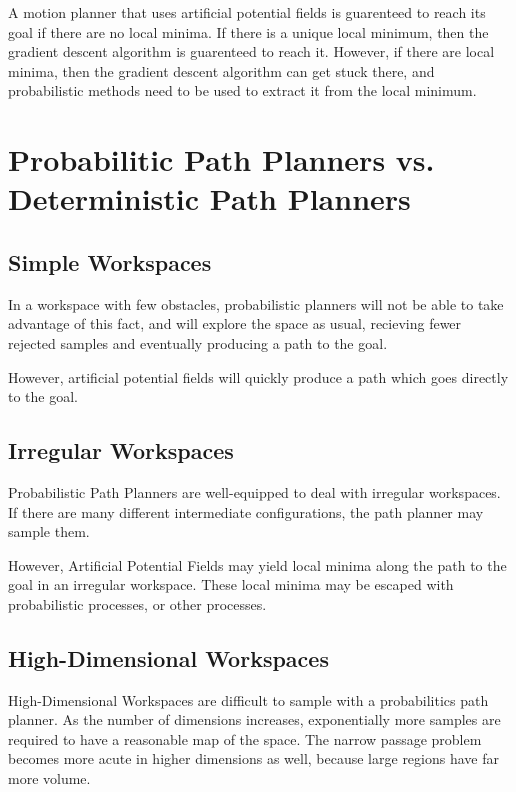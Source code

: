 \documentclass{article}
\begin{document}
A motion planner that uses artificial potential fields is guarenteed to reach its
	goal if there are no local minima.
If there is a unique local minimum, then the gradient descent algorithm is guarenteed
	to reach it.
However, if there are local minima, then the gradient descent algorithm can get stuck there,
	and probabilistic methods need to be used to extract it from the local minimum.

\section{Probabilitic Path Planners vs. Deterministic Path Planners}

\subsection{Simple Workspaces}

In a workspace with few obstacles, probabilistic planners will not be able to take
	advantage of this fact, and will explore the space as usual, recieving fewer
	rejected samples and eventually producing a path to the goal.

However, artificial potential fields will quickly produce a path which goes directly
	to the goal.

\subsection{Irregular Workspaces}

Probabilistic Path Planners are well-equipped to deal with irregular workspaces.
If there are many different intermediate configurations, the path planner
	may sample them.

However, Artificial Potential Fields may yield local minima along the path to the
	goal in an irregular workspace.
These local minima may be escaped with probabilistic processes, or other processes.

\subsection{High-Dimensional Workspaces}

High-Dimensional Workspaces are difficult to sample with a probabilitics
	path planner.
As the number of dimensions increases, exponentially more samples are required to have
	a reasonable map of the space.
The narrow passage problem becomes more acute in higher dimensions as well, because
	large regions have far more volume.
\end{document}
